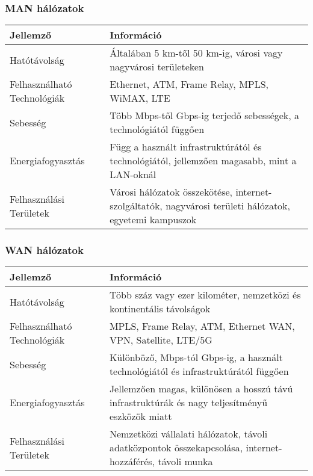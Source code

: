 \clearpage
\subsubsection{MAN hálózatok}
\begin{table}[ht]
    \centering
    \begin{tabularx}{\textwidth}{X X}
    \toprule
    \textbf{Jellemző} & \textbf{Információ} \\
    \midrule
    Hatótávolság & Általában 5 km-től 50 km-ig, városi vagy nagyvárosi területeken \\
    \hline
    Felhasználható Technológiák & Ethernet, ATM, Frame Relay, MPLS, WiMAX, LTE \\
    \hline
    Sebesség & Több Mbps-től Gbps-ig terjedő sebességek, a technológiától függően \\
    \hline
    Energiafogyasztás & Függ a használt infrastruktúrától és technológiától, jellemzően magasabb, mint a LAN-oknál \\
    \hline
    Felhasználási Területek & Városi hálózatok összekötése, internet-szolgáltatók, nagyvárosi területi hálózatok, egyetemi kampuszok \\
    \bottomrule
    \end{tabularx}
    \label{table:man_networks}
\end{table}

\clearpage
\subsubsection{WAN hálózatok}
\begin{table}[ht]
    \centering
    \begin{tabularx}{\textwidth}{X X}
    \toprule
    \textbf{Jellemző} & \textbf{Információ} \\
    \midrule
    Hatótávolság & Több száz vagy ezer kilométer, nemzetközi és kontinentális távolságok \\
    \hline
    Felhasználható Technológiák & MPLS, Frame Relay, ATM, Ethernet WAN, VPN, Satellite, LTE/5G \\
    \hline
    Sebesség & Különböző, Mbps-tól Gbps-ig, a használt technológiától és infrastruktúrától függően \\
    \hline
    Energiafogyasztás & Jellemzően magas, különösen a hosszú távú infrastruktúrák és nagy teljesítményű eszközök miatt \\
    \hline
    Felhasználási Területek & Nemzetközi vállalati hálózatok, távoli adatközpontok összekapcsolása, internet-hozzáférés, távoli munka \\
    \bottomrule
    \end{tabularx}
    \label{table:wan_networks}
\end{table}

